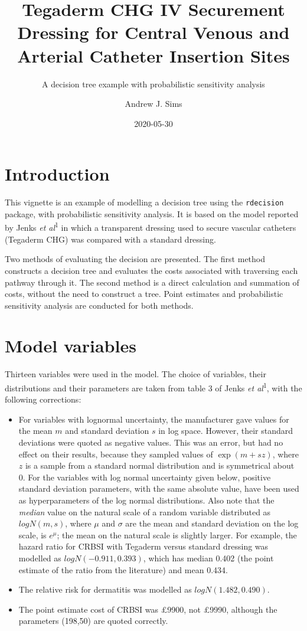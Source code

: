 \documentclass[]{article}
\title{Tegaderm CHG IV Securement Dressing for Central Venous and Arterial
Catheter Insertion Sites}
\subtitle{A decision tree example with probabilistic sensitivity analysis}
\author{Andrew J. Sims}
\date{2020-05-30}
\providecommand{\tightlist}{%
  \setlength{\itemsep}{0pt}\setlength{\parskip}{0pt}}
\begin{document}
\maketitle

\hypertarget{introduction}{%
\section{Introduction}\label{introduction}}

This vignette is an example of modelling a decision tree using the
\texttt{rdecision} package, with probabilistic sensitivity analysis. It
is based on the model reported by Jenks \emph{et al}\textsuperscript{1}
in which a transparent dressing used to secure vascular catheters
(Tegaderm CHG) was compared with a standard dressing.

Two methods of evaluating the decision are presented. The first method
constructs a decision tree and evaluates the costs associated with
traversing each pathway through it. The second method is a direct
calculation and summation of costs, without the need to construct a
tree. Point estimates and probabilistic sensitivity analysis are
conducted for both methods.

\hypertarget{model-variables}{%
\section{Model variables}\label{model-variables}}

Thirteen variables were used in the model. The choice of variables,
their distributions and their parameters are taken from table 3 of Jenks
\emph{et al}\textsuperscript{1}, with the following corrections:

\begin{itemize}
\tightlist
\item
  For variables with lognormal uncertainty, the manufacturer gave values
  for the mean \(m\) and standard deviation \(s\) in log space. However,
  their standard deviations were quoted as negative values. This was an
  error, but had no effect on their results, because they sampled values
  of \(\exp(m + sz)\), where \(z\) is a sample from a standard normal
  distribution and is symmetrical about 0. For the variables with log
  normal uncertainty given below, positive standard deviation
  parameters, with the same absolute value, have been used as
  hyperparameters of the log normal distributions. Also note that the
  \emph{median} value on the natural scale of a random variable
  distributed as \(logN(m,s)\), where \(\mu\) and \(\sigma\) are the
  mean and standard deviation on the log scale, is \(e^\mu\); the mean
  on the natural scale is slightly larger. For example, the hazard ratio
  for CRBSI with Tegaderm versus standard dressing was modelled as
  \(logN(-0.911,0.393)\), which has median 0.402 (the point estimate of
  the ratio from the literature) and mean 0.434.
\item
  The relative risk for dermatitis was modelled as
  \(logN(1.482,0.490)\).
\item
  The point estimate cost of CRBSI was £9900, not £9990, although the
  parameters (198,50) are quoted correctly.
\end{itemize}
\end{document}
